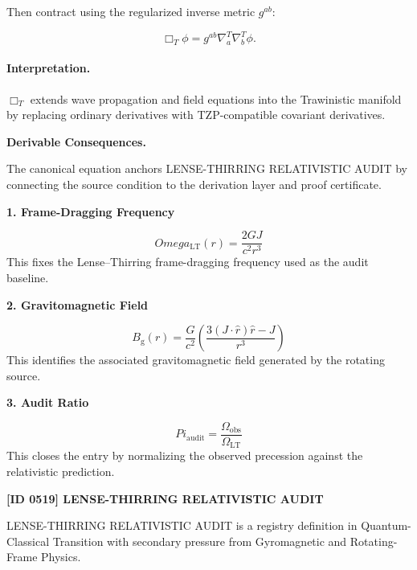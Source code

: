 Then contract using the regularized inverse metric $g^{ab}$:

\begin{equation}
\Box_T\phi
=
g^{ab}
\nabla^{T}_{a}
\nabla^{T}_{b}
\phi .
\end{equation}

\paragraph{Interpretation.}
$\Box_T$ extends wave propagation and field equations into the Trawinistic manifold by replacing ordinary derivatives with TZP-compatible covariant derivatives.

\par\vspace{0.35em}
\noindent\textbf{Derivable Consequences.}\quad
\begingroup
\footnotesize
\raggedright
The canonical equation anchors LENSE-THIRRING RELATIVISTIC AUDIT by connecting the source condition to the derivation layer and proof certificate.
\par\endgroup

\noindent\textbf{1. Frame-Dragging Frequency}\par
\[
Omega_{\mathrm{LT}}(r)=\frac{2GJ}{c^2 r^3}
\]
\noindent This fixes the Lense--Thirring frame-dragging frequency used as the audit baseline.\par
\noindent\textbf{2. Gravitomagnetic Field}\par
\[
B_{\mathrm{g}}(r)=\frac{G}{c^2}\!\left(\frac{3(J\cdot \hat r)\hat r-J}{r^3}\right)
\]
\noindent This identifies the associated gravitomagnetic field generated by the rotating source.\par
\noindent\textbf{3. Audit Ratio}\par
\[
Pi_{\mathrm{audit}}=\frac{\Omega_{\mathrm{obs}}}{\Omega_{\mathrm{LT}}}
\]
\noindent This closes the entry by normalizing the observed precession against the relativistic prediction.\par

\clearpage
\noindent\textbf{[ID 0519] LENSE-THIRRING RELATIVISTIC AUDIT}\par
\vspace{0.35em}
\begingroup\small
{}
LENSE-THIRRING RELATIVISTIC AUDIT is a registry definition in Quantum-Classical Transition with secondary pressure from Gyromagnetic and Rotating-Frame Physics.

